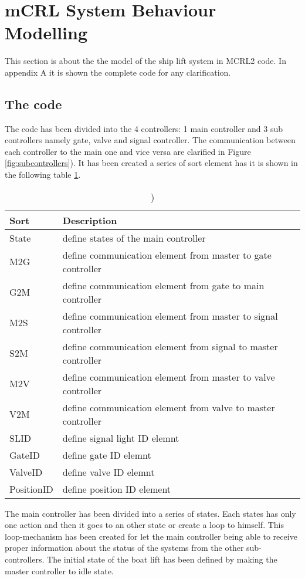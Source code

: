 \section{mCRL System Behaviour Modelling}
This section is about the the model of the ship lift system in MCRL2 code. In appendix A it is shown the complete code for any clarification.
\subsection{The code}
The code has been divided into the 4 controllers: 1 main controller and 3 sub controllers namely gate, valve and signal controller. The communication between each controller to the main one and vice versa are clarified in Figure \ref{fig:subcontrollers}).
It has been created a series of sort element has it is shown in the following table \ref{tab:sort}.
			\begin{table}[htbp]
	\centering
	\caption{)}
	\begin{tabular}{lp{6cm}l}
		\toprule
		\textbf{Sort} &  \textbf{Description} \\
		\hline
		State&  define states of the main controller \\
		M2G &  define communication element from master to gate controller\\
		G2M & define communication element from gate to main controller \\
		M2S &  define communication element from master to signal controller\\
		S2M &  define communication element from signal to master controller\\
		M2V &  define communication element from master to valve controller\\
		V2M &  define communication element from valve to master controller\\
		SLID &  define signal light ID elemnt\\
		GateID &  define gate ID elemnt\\
		ValveID &  define valve ID elemnt\\
		PositionID   & define position ID element\\
		
	\end{tabular}%
	\label{tab:sort}%
\end{table}%
The main controller has been divided into a series of states. Each states has only one action and then it goes to an other state or create a loop to himself. This loop-mechanism has been created for let the main controller being able to receive proper information about the status of the systems from the other sub-controllers. The initial state of the boat lift has been defined by making the master controller to idle state.\\
